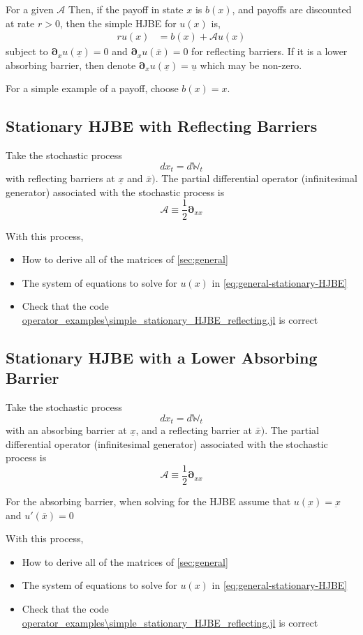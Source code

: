 \documentclass[11pt]{article}
\newcommand{\D}[1][]{\ensuremath{\boldsymbol{\partial}_{#1}}}
\newcommand{\W}{\ensuremath{\mathbb{W}}}
\newcommand{\A}{\ensuremath{\mathcal{A}}}
\begin{document}
For a given $\A$ Then, if the payoff in state $x$ is $b(x)$, and payoffs are discounted at rate $r > 0$, then the simple HJBE for $u(x)$ is,
\begin{align}
r u(x) &= b(x) + \A u(x)\label{eq:general-stationary-HJBE}
\end{align}
subject to $\D[x]u(\underline{x}) = 0$ and $\D[x]u(\bar{x}) = 0$ for reflecting barriers.  If it is a lower absorbing barrier, then denote $\D[x]u(\underline{x}) = \underline{u}$ which may be non-zero.

For a simple example of a payoff, choose $b(x) = x$.

\subsection{Stationary HJBE with Reflecting Barriers}
Take the stochastic process
$$
d x_t = d \W_t
$$
with reflecting barriers at $\underline{x}$ and $\bar{x})$.  The partial differential operator (infinitesimal generator) associated with the stochastic process is
$$
	\A \equiv \frac{1}{2}\D[xx]
$$

With this process,
\begin{itemize}
	\item How to derive all of the matrices of \cref{sec:general}
	\item The system of equations to solve for $u(x)$ in \cref{eq:general-stationary-HJBE}
	\item Check that the code \url{operator_examples\simple_stationary_HJBE_reflecting.jl} is correct
\end{itemize}

\subsection{Stationary HJBE with a Lower Absorbing Barrier}
Take the stochastic process
$$
d x_t = d \W_t
$$
with an absorbing barrier at $\underline{x}$, and a reflecting barrier at $\bar{x})$.  The partial differential operator (infinitesimal generator) associated with the stochastic process is
$$
\A \equiv \frac{1}{2}\D[xx]
$$

For the absorbing barrier, when solving for the HJBE assume that $u(\underbar{x}) = \underbar{x}$ and $u'(\bar{x}) = 0$


With this process,
\begin{itemize}
	\item How to derive all of the matrices of \cref{sec:general}
	\item The system of equations to solve for $u(x)$ in \cref{eq:general-stationary-HJBE}
	\item Check that the code \url{operator_examples\simple_stationary_HJBE_reflecting.jl} is correct
\end{itemize}
\end{document}
